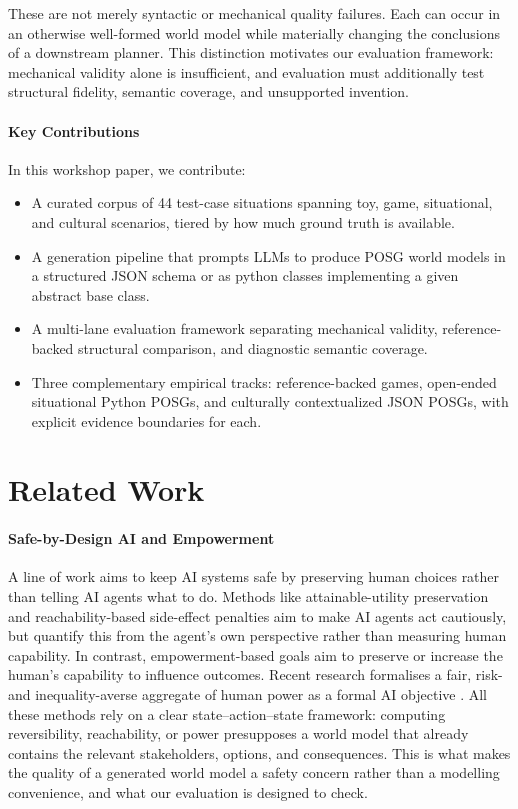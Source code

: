 \documentclass{article}
\begin{document}
These are not merely syntactic or mechanical quality failures. Each can occur in an otherwise well-formed world model while materially changing the conclusions of a downstream planner. This distinction motivates our evaluation framework: mechanical validity alone is insufficient, and evaluation must additionally test structural fidelity, semantic coverage, and unsupported invention.

\paragraph{Key Contributions}
In this workshop paper, we contribute:
\begin{itemize}
    \item A curated corpus of 44 test-case situations spanning toy, game, situational, and cultural scenarios, tiered by how much ground truth is available.
    \item A generation pipeline that prompts LLMs to produce POSG world models in a structured JSON schema or as python classes implementing a given abstract base class.
    \item A multi-lane evaluation framework separating mechanical validity, reference-backed structural comparison, and diagnostic semantic coverage.
    \item Three complementary empirical tracks: reference-backed games, open-ended situational Python POSGs, and culturally contextualized JSON POSGs, with explicit evidence boundaries for each.
\end{itemize}


\section{Related Work}
\label{sec:related_work}

\paragraph{Safe-by-Design AI and Empowerment}
A line of work aims to keep AI systems safe by preserving human choices rather than telling AI agents what to do. Methods like attainable-utility preservation \citep{turner2020conservative} and reachability-based side-effect penalties \citep{krakovna2020avoiding} aim to make AI agents act cautiously, but quantify this from the agent's own perspective rather than measuring human capability. In contrast, empowerment-based goals aim to preserve or increase the human's capability to influence outcomes. Recent research formalises a fair, risk- and inequality-averse aggregate of human power as a formal AI objective \citet{heitzigfair}. All these methods rely on a clear state–action–state framework: computing reversibility, reachability, or power presupposes a world model that already contains the relevant stakeholders, options, and consequences. This is what makes the quality of a generated world model a safety concern rather than a modelling convenience, and what our evaluation is designed to check.
\end{document}
